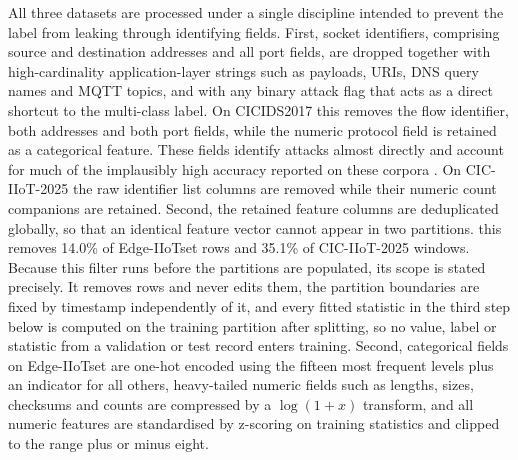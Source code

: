 \documentclass[10pt,letterpaper,twocolumn]{article}
\begin{document}
All three datasets are processed under a single discipline intended to prevent
the label from leaking through identifying fields. First, socket identifiers,
comprising source and destination addresses and all port fields, are dropped
together with high-cardinality application-layer strings such as payloads,
URIs, DNS query names and MQTT topics, and with any binary attack flag that
acts as a direct shortcut to the multi-class label. On CICIDS2017 this removes
the flow identifier, both addresses and both port fields, while the numeric
protocol field is retained as a categorical feature. These fields identify
attacks almost directly \cite{arp2022dos} and account for much of the
implausibly high accuracy reported on these corpora \cite{sarhan2022standard}.
On CIC-IIoT-2025 the raw identifier list columns are removed while their
numeric count companions are retained. Second, the retained feature columns are
deduplicated globally, so that an identical feature vector cannot appear in two
partitions. this removes 14.0\% of Edge-IIoTset rows and 35.1\% of
CIC-IIoT-2025 windows. Because this filter runs before the partitions are
populated, its scope is stated precisely. It removes rows and never edits them,
the partition boundaries are fixed by timestamp independently of it, and every
fitted statistic in the third step below is computed on the training partition
after splitting, so no value, label or statistic from a validation or test
record enters training. Second, categorical fields on Edge-IIoTset are
one-hot encoded using the fifteen most frequent levels plus an indicator for
all others, heavy-tailed numeric fields such as lengths, sizes, checksums and
counts are compressed by a $\log(1+x)$ transform, and all numeric features are
standardised by z-scoring on training statistics and clipped to the range plus
or minus eight.
\end{document}
